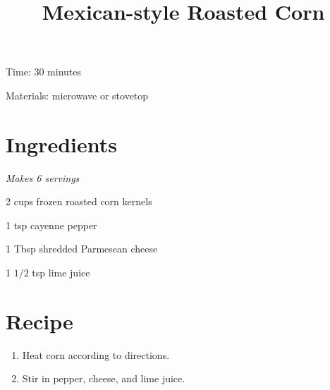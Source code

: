 \documentclass{article}
\title{Mexican-style Roasted Corn}
\begin{document}
\maketitle

Time: 30 minutes

Materials: microwave or stovetop

\section{Ingredients}
\textit{Makes 6 servings}

2 cups frozen roasted corn kernels

1 tsp cayenne pepper

1 Tbsp shredded Parmesean cheese

1 $1/2$ tsp lime juice

\section{Recipe}
\begin{enumerate}
\item{Heat corn according to directions.}
\item{Stir in pepper, cheese, and lime juice.}
\end{enumerate}
\end{document}
